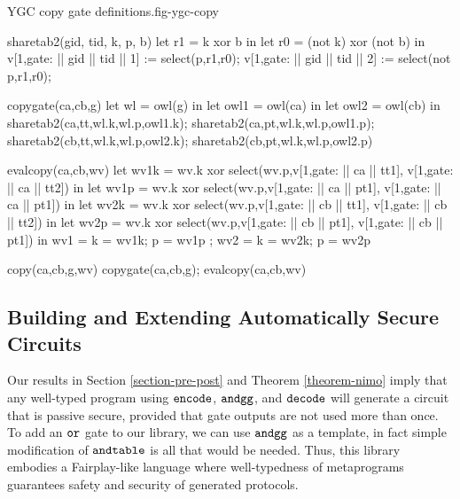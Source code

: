 \begin{fpfig}[t]{YGC copy gate definitions.}{fig-ygc-copy}
  {\footnotesize
    \begin{verbatimtab}
      sharetab2(gid, tid, k, p, b)
      {
        let r1 = k xor b in
        let r0 = (not k) xor (not b) in
        v[1,gate: || gid || tid || 1] := select(p,r1,r0);
        v[1,gate: || gid || tid || 2] := select(not p,r1,r0);
      }
      
      copygate(ca,cb,g)
      {
        let wl = owl(g) in
        let owl1 = owl(ca) in
        let owl2 = owl(cb) in
        sharetab2(ca,tt,wl.k,wl.p,owl1.k); sharetab2(ca,pt,wl.k,wl.p,owl1.p);
        sharetab2(cb,tt,wl.k,wl.p,owl2.k); sharetab2(cb,pt,wl.k,wl.p,owl2.p)
      }
      
      evalcopy(ca,cb,wv)
      {
        let wv1k = wv.k xor select(wv.p,v[1,gate: || ca || tt1], v[1,gate: || ca || tt2]) in
        let wv1p = wv.k xor select(wv.p,v[1,gate: || ca || pt1], v[1,gate: || ca || pt1]) in
        let wv2k = wv.k xor select(wv.p,v[1,gate: || cb || tt1], v[1,gate: || cb || tt2]) in
        let wv2p = wv.k xor select(wv.p,v[1,gate: || cb || pt1], v[1,gate: || cb || pt1]) in
        { wv1 = { k = wv1k; p = wv1p }; wv2 = { k = wv2k; p = wv2p } }  
      }

      copy(ca,cb,g,wv) { copygate(ca,cb,g); evalcopy(ca,cb,wv) } 
    \end{verbatimtab}
  }
\end{fpfig}

\subsection{Building and Extending Automatically Secure Circuits}
\label{section-composition-copy}

Our results in Section \ref{section-pre-post} and Theorem
\ref{theorem-nimo} imply that any well-typed program using
$\texttt{encode}$, $\texttt{andgg}$, and $\texttt{decode}$ will generate a
circuit that is passive secure, provided that gate outputs are
not used more than once. To add an $\texttt{or}$ gate to our
library, we can use $\texttt{andgg}$ as a template, in fact simple
modification of $\texttt{andtable}$ is all that would be needed. Thus,
this library embodies a Fairplay-like language where well-typedness
of metaprograms guarantees safety and security of generated protocols.

